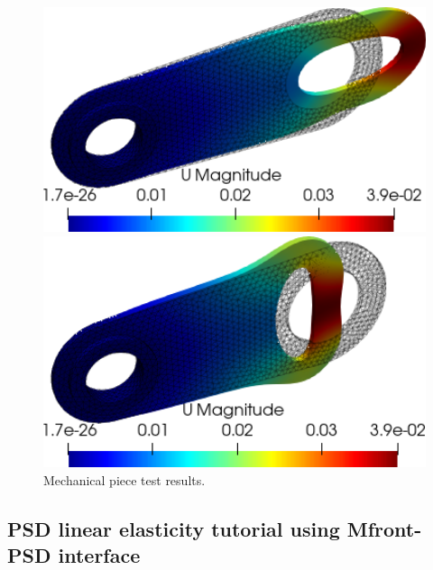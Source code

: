 \begin{figure}[htbp]
    \centering
    \begin{minipage}{0.42\textwidth}
    \includegraphics[align=b,width=1\textwidth]{./Images/3d-mechanical-result-x.png}
    \end{minipage}\hspace{.1\textwidth}
    \begin{minipage}{0.4\textwidth}
    \includegraphics[align=b,width=1\textwidth]{./Images/3d-mechanical-result--x.png}
    \end{minipage}
    \caption{Mechanical piece test results.}
    \label{fig:mechapieceresult2}
\end{figure}

\subsection{PSD linear elasticity tutorial using Mfront-PSD interface\label{sec:2d-mfront}}

